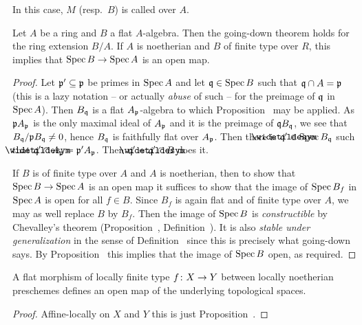\documentclass[a4paper,parskip=half,numbers=enddot, DIV=12]{scrreprt}
\begin{document}
\begin{defi}
	In this case, $M$ (resp.\ $B$) is called  over $A$.
\end{defi}
\begin{prop}
	Let $A$ be a ring and $B$ a flat $A$-algebra. Then the going-down theorem holds for the ring extension $B/A$. If $A$ is noetherian and $B$ of finite type over $R$, this implies that $\Spec B\morphism\Spec A$ is an open map.
\end{prop}
\begin{proof}
	Let $\mathfrak{p}'\subseteq \mathfrak{p}$ be primes in $\operatorname{Spec} A$ and let $\mathfrak{q}\in\operatorname{Spec} B$ such that $\mathfrak{q}\cap A=\mathfrak{p}$ (this is a lazy notation -- or actually \emph{abuse} of such -- for the preimage of $\mathfrak{q}$ in $\operatorname{Spec} A$). Then $B_{\mathfrak{q}}$ is a flat $A_{\mathfrak{p}}$-algebra to which Proposition~ may be applied. As $\mathfrak{p} A_{\mathfrak{p}}$ is the only maximal ideal of $A_{\mathfrak{p}}$ and it is the preimage of $\mathfrak{q} B_{\mathfrak{q}}$, we see that $B_{\mathfrak{q}}/\mathfrak{p} B_{\mathfrak{q}}\neq 0$, hence $B_{\mathfrak{q}}$ is faithfully flat over $A_{\mathfrak{p}}$. Then there is $\snake{\qq}'\in\Spec B_\qq$ such that $\snake{\qq}'\cap A_\pp=\pp'A_\pp$. Then $\qq'=\snake{\qq}'\cap B$ does it.
	
	If $B$ is of finite type over $A$ and $A$ is noetherian, then to show that $\Spec B\morphism \Spec A$ is an open map it suffices to show that the image of $\operatorname{Spec} B_f$ in $\operatorname{Spec} A$ is open for all $f\in B$. Since $B_f$ is again flat and of finite type over $A$, we may as well replace $B$ by $B_f$. Then the image of $\operatorname{Spec} B$ is \emph{constructible} by Chevalley's theorem (Proposition~, Definition~). It is also \emph{stable under generalization} in the sense of Definition~ since this is precisely what going-down says. By Proposition~ this implies that the image of $\operatorname{Spec} B$ open, as required.
\end{proof}
\begin{cor}
	A flat morphism of locally finite type $f\colon X\morphism Y$ between locally noetherian preschemes defines an open map of the underlying topological spaces.
\end{cor}
\begin{proof}
	Affine-locally on $X$ and $Y$ this is just Proposition~.
\end{proof}
\end{document}
